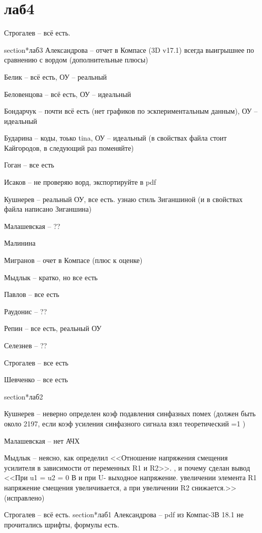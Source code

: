 \documentclass[a4paper,11pt]{article}
\begin{document}
\newpage
\section*{лаб4}
Строгалев -- всё есть.

\newpage
section*{лаб3}
Александрова -- отчет в Компасе (3D v17.1) всегда выигрышнее по сравнению с вордом (дополнительные плюсы)

Белик -- всё есть, ОУ -- реальный

Беловенцова  -- всё есть, ОУ -- идеальный

Бондарчук -- почти всё есть (нет графиков по эскпериментальным данным), ОУ -- идеальный

Бударина -- коды, тоько tina, ОУ -- идеальный  (в свойствах файла стоит Кайгородов, в следующий раз поменяйте)

Гоган  -- все есть

Исаков -- не проверяю ворд, экспортируйте в pdf

Кушнерев -- реальный ОУ, все есть. узнаю стиль  Зиганшиной (и в свойствах файла написано Зиганшина)

Малашевская -- ?? %

Малинина 

Мигранов -- очет в Компасе (плюс к оценке)

Мыдлык -- кратко, но все есть

Павлов -- все есть

Раудонис -- ??

Репин -- все есть, реальный ОУ

Селезнев -- ?? %

Строгалев -- все есть 

Шевченко -- все есть

\newpage
section*{лаб2}

Кушнерев -- неверно определен коэф подавления синфазных помех (должен быть около 2197, если коэф усиления синфазного сигнала взял теоретический =1 )

Малашевская -- нет АЧХ

Мыдлык -- неясно, как определил <<Отношение напряжения смещения усилителя в зависимости от переменных R1 и R2>>.
, и почему сделан вывод 
<<При u1 = u2 = 0 В и при U- выходное напряжение. увеличении элемента R1 напряжение смещения увеличивается, а при увеличении R2 снижается.>>(исправлено)

Строгалев -- всё есть.
\newpage
section*{лаб1}
Александрова -- pdf из Компас-3В 18.1 не прочитались шрифты, формулы есть.
\end{document}
